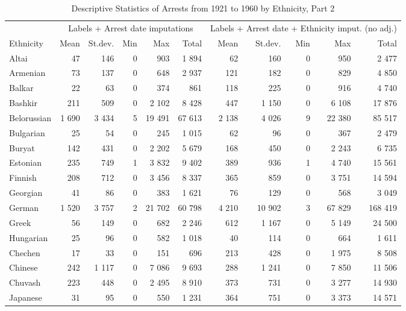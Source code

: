 \begin{table}[!h]

\caption{\label{tab:descr_stats_date_imp}Descriptive Statistics of Arrests from 1921 to 1960 by Ethnicity, Part 2}
\centering
\fontsize{8}{10}\selectfont
\begin{tabular}{lrrrrrrrrrr}
\toprule
\multicolumn{1}{c}{ } & \multicolumn{5}{c}{Labels + Arrest date imputations} & \multicolumn{5}{c}{Labels + Arrest date + Ethnicity imput. (no adj.)} \\
\cmidrule(l{2pt}r{2pt}){2-6} \cmidrule(l{2pt}r{2pt}){7-11}
Ethnicity & Mean & St.dev. & Min & Max & Total & Mean & St.dev. & Min & Max & Total\\
\midrule
Altai & 47 & 146 & 0 & 903 & 1 894 & 62 & 160 & 0 & 950 & 2 477\\
Armenian & 73 & 137 & 0 & 648 & 2 937 & 121 & 182 & 0 & 829 & 4 850\\
Balkar & 22 & 63 & 0 & 374 & 861 & 118 & 225 & 0 & 916 & 4 740\\
Bashkir & 211 & 509 & 0 & 2 102 & 8 428 & 447 & 1 150 & 0 & 6 108 & 17 876\\
Belorussian & 1 690 & 3 434 & 5 & 19 491 & 67 613 & 2 138 & 4 026 & 9 & 22 380 & 85 517\\
Bulgarian & 25 & 54 & 0 & 245 & 1 015 & 62 & 96 & 0 & 367 & 2 479\\
Buryat & 142 & 431 & 0 & 2 202 & 5 679 & 168 & 450 & 0 & 2 243 & 6 735\\
Estonian & 235 & 749 & 1 & 3 832 & 9 402 & 389 & 936 & 1 & 4 740 & 15 561\\
Finnish & 208 & 712 & 0 & 3 456 & 8 337 & 365 & 859 & 0 & 3 751 & 14 594\\
Georgian & 41 & 86 & 0 & 383 & 1 621 & 76 & 129 & 0 & 568 & 3 049\\
German & 1 520 & 3 757 & 2 & 21 702 & 60 798 & 4 210 & 10 902 & 3 & 67 829 & 168 419\\
Greek & 56 & 149 & 0 & 682 & 2 246 & 612 & 1 167 & 0 & 5 149 & 24 500\\
Hungarian & 25 & 96 & 0 & 582 & 1 018 & 40 & 114 & 0 & 664 & 1 611\\
Chechen & 17 & 33 & 0 & 151 & 696 & 213 & 428 & 0 & 1 975 & 8 508\\
Chinese & 242 & 1 117 & 0 & 7 086 & 9 693 & 288 & 1 241 & 0 & 7 850 & 11 506\\
Chuvash & 223 & 448 & 0 & 2 495 & 8 910 & 373 & 731 & 0 & 3 277 & 14 930\\
Japanese & 31 & 95 & 0 & 550 & 1 231 & 364 & 751 & 0 & 3 373 & 14 571\\

\end{tabular}
\end{table}
